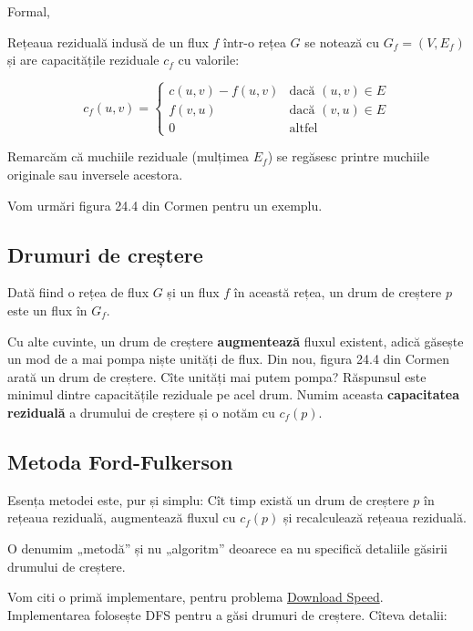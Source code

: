 \documentclass[../main.tex]{subfiles}
\begin{document}
Formal,

\begin{definition}
  Rețeaua reziduală indusă de un flux $f$ într-o rețea $G$ se notează cu $G_f = (V, E_f)$ și are capacitățile reziduale $c_f$ cu valorile:
\end{definition}

$$
c_f(u, v) =
\begin{cases}
c(u,v) - f(u,v) & \text{dacă } (u,v) \in E \\
f(v,u) & \text{dacă } (v,u) \in E \\
0 & \text{altfel}
\end{cases}
$$

Remarcăm că muchiile reziduale (mulțimea $E_f$) se regăsesc printre muchiile originale sau inversele acestora.

Vom urmări figura 24.4 din Cormen pentru un exemplu.

\subsection{Drumuri de creștere}

\begin{definition}
  Dată fiind o rețea de flux $G$ și un flux $f$ în această rețea, un drum de creștere $p$ este un flux în $G_f$.
\end{definition}

Cu alte cuvinte, un drum de creștere \textbf{augmentează} fluxul existent, adică găsește un mod de a mai pompa niște unități de flux. Din nou, figura 24.4 din Cormen arată un drum de creștere. Cîte unități mai putem pompa? Răspunsul este minimul dintre capacitățile reziduale pe acel drum. Numim aceasta \textbf{capacitatea reziduală} a drumului de creștere și o notăm cu $c_f(p)$.

\subsection{Metoda Ford-Fulkerson}

Esența metodei este, pur și simplu: Cît timp există un drum de creștere $p$ în rețeaua reziduală, augmentează fluxul cu $c_f(p)$ și recalculează rețeaua reziduală.

O denumim „metodă” și nu „algoritm” deoarece ea nu specifică detaliile găsirii drumului de creștere.

Vom citi o primă implementare, pentru problema \hyperref[problem:download-speed]{Download Speed}. Implementarea folosește DFS pentru a găsi drumuri de creștere. Cîteva detalii:
\end{document}
